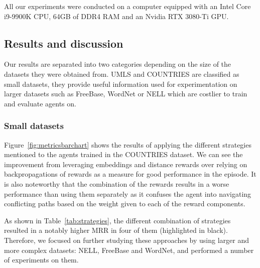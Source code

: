 All our experiments were conducted on a computer equipped with an Intel Core i9-9900K CPU, 64GB of DDR4 RAM and an Nvidia RTX 3080-Ti GPU.



\subsection{Results and discussion}

Our results are separated into two categories depending on the size of the datasets they were obtained from. UMLS and COUNTRIES are classified as small datasets, they provide useful information used for experimentation on larger datasets such as FreeBase, WordNet or NELL which are costlier to train and evaluate agents on.

\subsubsection{Small datasets} \label{sssec:smalldatasets}
Figure~\ref{fig:metricsbarchart} shows the results of applying the different strategies mentioned to the agents trained in the COUNTRIES dataset. We can see the improvement from leveraging embeddings and distance rewards over relying on backpropagations of rewards as a measure for good performance in the episode. It is also noteworthy that the combination of the rewards results in a worse performance than using them separately as it confuses the agent into navigating conflicting paths based on the weight given to each of the reward components.

As shown in Table~\ref{tab:strategies}, the different combination of strategies resulted in a notably higher MRR in four of them (highlighted in black). Therefore, we focused on further studying these approaches by using larger and more complex datasets: NELL, FreeBase and WordNet, and performed a number of experiments on them. 

